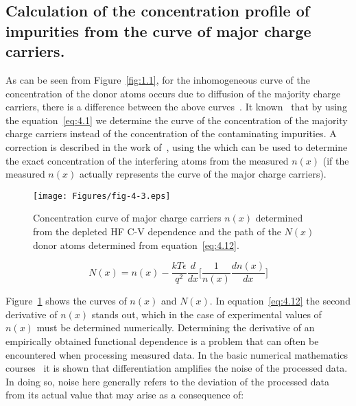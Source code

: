 \subsection[Calculation of the concentration profile of impurities from the curve of major charge carriers.]{Calculation of the concentration profile of impurities from the curve of major charge carriers.}\label{sec:4.1.4}

As can be seen from Figure~\ref{fig:1.1}, for the inhomogeneous
curve of the concentration of the donor atoms occurs due to
diffusion of the majority charge carriers, there is a difference
between the above curves~\cite{4.16}. It known~\cite{4.17} that by
using the equation~\ref{eq:4.1} we determine the curve of the
concentration of the majority charge carriers instead of the
concentration of the contaminating impurities. A correction is
described in the work of~\cite{4.18}, using the which can be used to
determine the exact concentration of the interfering atoms from the
measured $n (x)$ (if the measured $n (x)$ actually represents the
curve of the major charge carriers).

\begin{figure}[h!]\centering
  \begin{minipage}[c]{\myfiguresize}
    \begin{center}
      \texttt{[image: Figures/fig-4-3.eps]}
      \caption[Majority charge carrier concentration $n(x)$ determined
        from the depleted HF C-V dependence and the progression of the
        donating atoms $N (x)$ determined from the
        equation~\ref{eq:4.12}]{Concentration curve of major charge
        carriers $n (x)$ determined from the depleted HF C-V
        dependence and the path of the $N (x)$ donor atoms determined
        from equation~\ref{eq:4.12}.}\label{fig:4.3}
    \end{center}
  \end{minipage}
\end{figure}

\begin{equation}\label{eq:4.12}
  N(x) = n(x) - {\frac{kT\epsilon}{q^{2}} {\frac{d}{dx}} {\Bigg[\frac{1}{n(x)}\frac{dn(x)}{dx}\Bigg]}}
\end{equation}

Figure~\ref{fig:4.3} shows the curves of $n(x)$ and $N(x)$. In
equation~\ref{eq:4.12} the second derivative of $n(x)$ stands out,
which in the case of experimental values of $n(x)$ must be determined
numerically. Determining the derivative of an empirically obtained
functional dependence is a problem that can often be encountered when
processing measured data. In the basic numerical mathematics
courses~\cite{4.19} it is shown that differentiation amplifies the
noise of the processed data. In doing so, noise here generally refers
to the deviation of the processed data from its actual value that may
arise as a consequence of:

